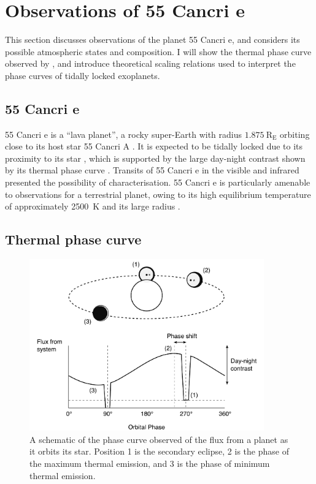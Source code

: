 \newpage
\section{Observations of 55 Cancri e}\label{sec:obs-55cnce}

This section discusses observations of the planet 55 Cancri e, and considers its possible atmospheric states and composition. I will show the thermal phase curve observed by \citet{demory201655cnce}, and introduce theoretical scaling relations used to interpret the phase curves of tidally locked exoplanets.

\subsection{55 Cancri e}

55 Cancri e is a ``lava planet'', a rocky super-Earth with radius $1.875\ \mathrm{R_{E}}$ orbiting close to its host star 55 Cancri A \citep{crida201855cnce}. It is expected to be tidally locked due to its proximity to its star \citep{pierrehumbert2018review}, which is supported by the large day-night contrast shown by its thermal phase curve \citep{demory201655cnce}. Transits of 55 Cancri e in the visible \citep{winn2011super} and infrared \citep{demory201155cnce} presented the possibility of characterisation. 55 Cancri e is particularly amenable to observations for a terrestrial planet, owing to its high equilibrium temperature of approximately \SI{2500}{\kelvin} and its large radius \citep{tinetti2016ariel}.


\subsection{Thermal phase curve}

\begin{figure}
  \centering
    \includegraphics[width=0.9\textwidth]{figures/linking-climate-55cnce/phase-curve-diagram.pdf}
    \caption{A schematic of the phase curve observed of the flux from a planet as it orbits its star. Position 1 is the secondary eclipse, 2 is the phase of the maximum thermal emission, and 3 is the phase of minimum thermal emission.}
    \label{fig:phase-curve-diagram}
\end{figure}

